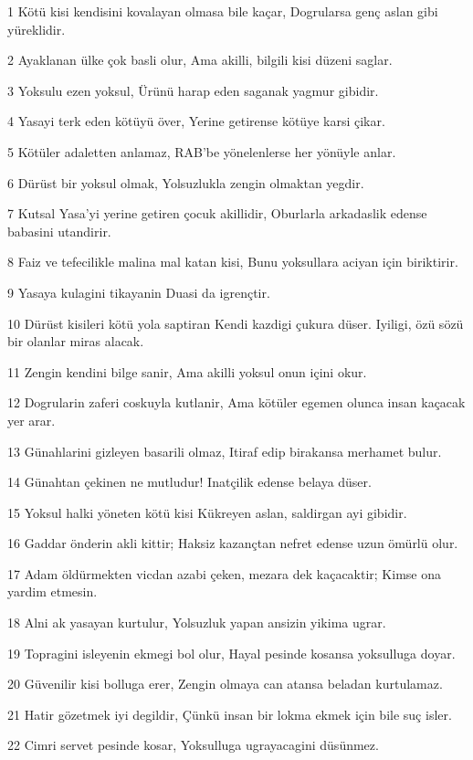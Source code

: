 \par 1 Kötü kisi kendisini kovalayan olmasa bile kaçar, Dogrularsa genç aslan gibi yüreklidir.
\par 2 Ayaklanan ülke çok basli olur, Ama akilli, bilgili kisi düzeni saglar.
\par 3 Yoksulu ezen yoksul, Ürünü harap eden saganak yagmur gibidir.
\par 4 Yasayi terk eden kötüyü över, Yerine getirense kötüye karsi çikar.
\par 5 Kötüler adaletten anlamaz, RAB'be yönelenlerse her yönüyle anlar.
\par 6 Dürüst bir yoksul olmak, Yolsuzlukla zengin olmaktan yegdir.
\par 7 Kutsal Yasa'yi yerine getiren çocuk akillidir, Oburlarla arkadaslik edense babasini utandirir.
\par 8 Faiz ve tefecilikle malina mal katan kisi, Bunu yoksullara aciyan için biriktirir.
\par 9 Yasaya kulagini tikayanin Duasi da igrençtir.
\par 10 Dürüst kisileri kötü yola saptiran Kendi kazdigi çukura düser. Iyiligi, özü sözü bir olanlar miras alacak.
\par 11 Zengin kendini bilge sanir, Ama akilli yoksul onun içini okur.
\par 12 Dogrularin zaferi coskuyla kutlanir, Ama kötüler egemen olunca insan kaçacak yer arar.
\par 13 Günahlarini gizleyen basarili olmaz, Itiraf edip birakansa merhamet bulur.
\par 14 Günahtan çekinen ne mutludur! Inatçilik edense belaya düser.
\par 15 Yoksul halki yöneten kötü kisi Kükreyen aslan, saldirgan ayi gibidir.
\par 16 Gaddar önderin akli kittir; Haksiz kazançtan nefret edense uzun ömürlü olur.
\par 17 Adam öldürmekten vicdan azabi çeken, mezara dek kaçacaktir; Kimse ona yardim etmesin.
\par 18 Alni ak yasayan kurtulur, Yolsuzluk yapan ansizin yikima ugrar.
\par 19 Topragini isleyenin ekmegi bol olur, Hayal pesinde kosansa yoksulluga doyar.
\par 20 Güvenilir kisi bolluga erer, Zengin olmaya can atansa beladan kurtulamaz.
\par 21 Hatir gözetmek iyi degildir, Çünkü insan bir lokma ekmek için bile suç isler.
\par 22 Cimri servet pesinde kosar, Yoksulluga ugrayacagini düsünmez.
